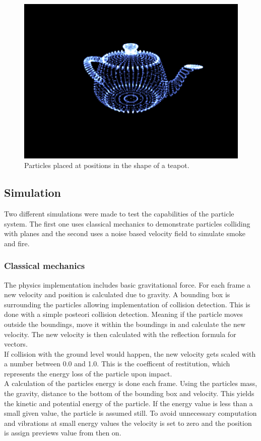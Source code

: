 \documentclass[report]{vgtc}
\begin{document}
\begin{figure}[H]
\includegraphics[scale=0.5]{img/teapot.png}
\caption{Particles placed at positions in the shape of a teapot.}
\end{figure}

\subsection{Simulation}
Two different simulations were made to test the capabilities of the particle system. The first one uses classical mechanics to demonstrate particles colliding with planes and the second uses a noise based velocity field to simulate smoke and fire. 


\subsubsection{Classical mechanics}
The physics implementation includes basic gravitational force. For each frame a new velocity and position is calculated due to gravity. 
A bounding box is surrounding the particles allowing implementation of collision detection. This is done with a simple posteori collision detection. Meaning if the particle moves outside the boundings, move it within the boundings in and calculate the new velocity. The new velocity is then calculated with the reflection formula for vectors.\\
If collision with the ground level would happen, the new velocity gets scaled with a number between 0.0 and 1.0. This is the coefficent of restitution, which represents the energy loss of the particle upon impact.\\
A calculation of the particles energy is done each frame. Using the particles mass, the gravity, distance to the bottom of the bounding box and velocity. This yields the kinetic and potential energy of the particle. If the energy value is less than a small given value, the particle is assumed still. To avoid unnecessary computation and vibrations at small energy values the velocity is set to zero and the position is assign previews value from then on.
\end{document}
